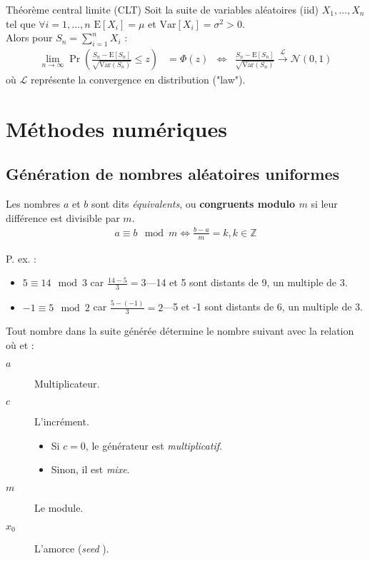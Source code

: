 \documentclass[10pt, french]{article}
\begin{document}
\begin{multicols*}{2}
\begin{algo}{Théorème central limite (CLT)}
Soit la suite de variables aléatoires (iid) $X_{1}, \dots, X_{n}$ tel que $\forall i = 1, \dots, n$ $\text{E}[X_{i}] = \mu$ et $\text{Var}[X_{i}] = \sigma^{2} > 0$.\\
Alors pour $S_{n} = \sum_{i = 1}^{n} X_{i}$ :
\begin{align*} 
	\underset{n \rightarrow \infty}{\lim} \Pr\left( \frac{S_{n} - \text{E}[S_{n}]}{\sqrt{\text{Var}(S_{n})}} \le z \right) 
	&=	\Phi(z)
	&\Leftrightarrow	&
	\frac{S_{n} - \text{E}[S_{n}]}{\sqrt{\text{Var}(S_{n})}} \overset{\mathcal{L}}{\longrightarrow} \mathcal{N}(0, 1)
\end{align*}
où $\mathcal{L}$ représente la convergence en distribution ("law").
\end{algo}


\pagebreak
\section{Méthodes numériques}
\subsection{Génération de nombres aléatoires uniformes}
\begin{definitionNOHFILL}[Congruence]
Les nombres $a$ et $b$ sont dits \textit{équivalents}, ou \textbf{congruents modulo $m$} si leur différence est divisible par $m$.
\begin{align*}
	a	\equiv	b	\mod		m	
	\Leftrightarrow	\frac{b	-	a}{m}	=	k, k		\in	\mathbb{Z}
\end{align*}

P. ex. :
\begin{itemize}
	\item	$5	\equiv	14 \mod 3$ car $\frac{14 - 5}{3}	=3$---14 et 5 sont distants de 9, un multiple de 3.
	\item	$-1	\equiv	5 \mod 2$ car $\frac{5 - (-1)}{3}	=2$---5 et -1 sont distants de 6, un multiple de 3.
\end{itemize}
\end{definitionNOHFILL}

\begin{definitionNOHFILL}
Tout nombre dans la suite générée détermine le nombre suivant avec la relation  où  et :
\begin{description}
	\item[$a$]	Multiplicateur.
	\item[$c$]	L'incrément.
		\begin{itemize}
		\item	Si $c	=	0$, le générateur est \textit{multiplicatif}.
		\item	Sinon, il est \textit{mixe}.
		\end{itemize}
	\item[$m$]	Le module.
	\item[$x_{0}$]	L'amorce (\og \textit{seed} \fg{}).
\end{description}


\end{definitionNOHFILL}
\end{multicols*}
\end{document}
